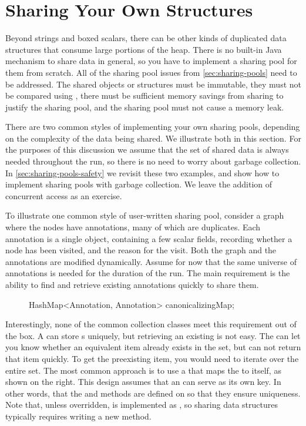 \section{Sharing Your Own Structures}
\label{sec:canonicalizing-maps}

Beyond strings and boxed scalars, there can be other kinds of
duplicated data structures that consume large portions of the heap. 
There is no built-in Java mechanism to share data
in general, so you have to implement a sharing pool for them from
scratch. All of the sharing pool issues from \autoref{sec:sharing-pools} need
to be addressed. The shared objects or structures must be immutable, they must not be
compared using \code{==}, there must be sufficient memory savings from sharing
to justify the sharing pool, and the sharing pool must not cause a memory leak. 

There are two common styles of implementing your own sharing pools, depending on
the complexity of the data being shared.  We illustrate both in this section. 
For the purposes of this discussion we assume that the set of shared data is
always needed throughout the run, so there is no need to worry about garbage collection. In
\autoref{sec:sharing-pools-safety} we revisit these two examples, and show how
to implement sharing pools with garbage collection.  We leave the addition of
concurrent access as an exercise. 

To illustrate one common style of user-written sharing pool, consider a graph
where the nodes have annotations, many of which are duplicates. Each annotation is a single
object, containing a few scalar fields, recording whether a node has been
visited, and the reason for the visit.  Both the graph and the annotations are modified
dynamically. Assume for now that the same universe of annotations is needed for
the duration of the run. The main requirement is the ability to find and
retrieve existing annotations quickly to share them.

\begin{figure}
\centering
\begin{framedlisting}
HashMap<Annotation, Annotation> canonicalizingMap;
\end{framedlisting}
\end{figure}

Interestingly, none of the common collection classes meet this requirement
out of the box. A  can store s uniquely, but
retrieving an existing  is not easy. The 
can let you know whether an equivalent item already
exists in the set, but can not return that item quickly. To get the
preexisting item, you would need to iterate over the entire set. The
most common approach is to use a
 that maps the  to itself, as shown on the
right. This design assumes that an  can serve as its own key.
In other words, that the  and  methods are
defined on  so that they ensure uniqueness. Note that, unless overridden,  is
implemented as \code{==}, so sharing data structures typically requires writing
a new  method.  

